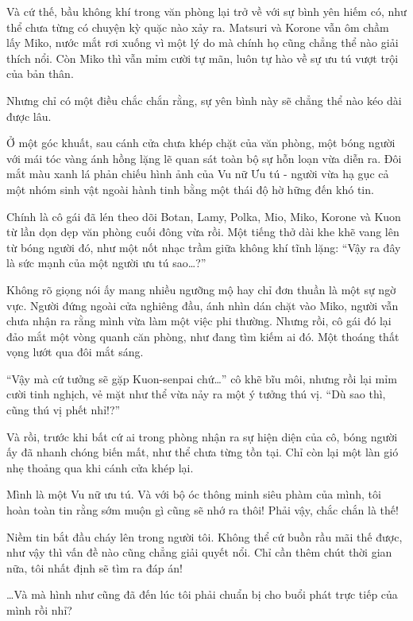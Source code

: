 \documentclass[../main.tex]{subfiles}
\begin{document}
Và cứ thế, bầu không khí trong văn phòng lại trở về với sự bình yên hiếm có, như thể chưa từng có chuyện kỳ quặc nào xảy ra. Matsuri và Korone vẫn ôm chầm lấy Miko, nước mắt rơi xuống vì một lý do mà chính họ cũng chẳng thể nào giải thích nổi. Còn Miko thì vẫn mỉm cười tự mãn, luôn tự hào về sự ưu tú vượt trội của bản thân.

Nhưng chỉ có một điều chắc chắn rằng, sự yên bình này sẽ chẳng thể nào kéo dài được lâu.

\il

Ở một góc khuất, sau cánh cửa chưa khép chặt của văn phòng, một bóng người với mái tóc vàng ánh hồng lặng lẽ quan sát toàn bộ sự hỗn loạn vừa diễn ra. Đôi mắt màu xanh lá phản chiếu hình ảnh của Vu nữ Ưu tú - người vừa hạ gục cả một nhóm sinh vật ngoài hành tinh bằng một thái độ hờ hững đến khó tin.

Chính là cô gái đã lén theo dõi Botan, Lamy, Polka, Mio, Miko, Korone và Kuon từ lần dọn dẹp văn phòng cuối đông vừa rồi. Một tiếng thở dài khe khẽ vang lên từ bóng người đó, như một nốt nhạc trầm giữa không khí tĩnh lặng: ``Vậy ra đây là sức mạnh của một người ưu tú sao\dots?''

Không rõ giọng nói ấy mang nhiều ngưỡng mộ hay chỉ đơn thuần là một sự ngờ vực. Người đứng ngoài cửa nghiêng đầu, ánh nhìn dán chặt vào Miko, người vẫn chưa nhận ra rằng mình vừa làm một việc phi thường. Nhưng rồi, cô gái đó lại đảo mắt một vòng quanh căn phòng, như đang tìm kiếm ai đó. Một thoáng thất vọng lướt qua đôi mắt sáng.

``Vậy mà cứ tưởng sẽ gặp Kuon-senpai chứ\dots'' cô khẽ bĩu môi, nhưng rồi lại mỉm cười tinh nghịch, vẻ mặt như thể vừa nảy ra một ý tưởng thú vị. ``Dù sao thì, cũng thú vị phết nhỉ!?''

Và rồi, trước khi bất cứ ai trong phòng nhận ra sự hiện diện của cô, bóng người ấy đã nhanh chóng biến mất, như thể chưa từng tồn tại. Chỉ còn lại một làn gió nhẹ thoảng qua khi cánh cửa khép lại.

\il


Mình là một Vu nữ ưu tú. Và với bộ óc thông minh siêu phàm của mình, tôi hoàn toàn tin rằng sớm muộn gì cũng sẽ nhớ ra thôi! Phải vậy, chắc chắn là thế!

Niềm tin bắt đầu cháy lên trong người tôi. Không thể cứ buồn rầu mãi thế được, như vậy thì vấn đề nào cũng chẳng giải quyết nổi. Chỉ cần thêm chút thời gian nữa, tôi nhất định sẽ tìm ra đáp án!

\dots Và mà hình như cũng đã đến lúc tôi phải chuẩn bị cho buổi phát trực tiếp của mình rồi nhỉ?
\end{document}
